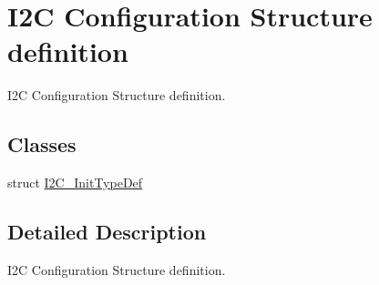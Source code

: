 \hypertarget{group___i2_c___configuration___structure__definition}{\section{I2\-C Configuration Structure definition}
\label{group___i2_c___configuration___structure__definition}
}


I2\-C Configuration Structure definition.  


\subsection*{Classes}
\begin{DoxyCompactItemize}
\item 
struct \hyperlink{struct_i2_c___init_type_def}{I2\-C\-\_\-\-Init\-Type\-Def}
\end{DoxyCompactItemize}


\subsection{Detailed Description}
I2\-C Configuration Structure definition. 